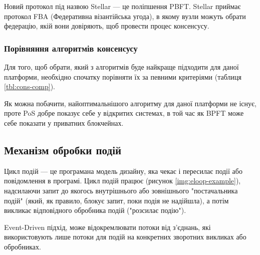 \documentclass{lib/styles/default-style}
\begin{document}
    Новий протокол під назвою Stellar --- це поліпшення PBFT.
    Stellar приймає протокол FBA (Федеративна візантійська угода), в якому вузли можуть обрати федерацію,
    якій вони довіряють, щоб провести процес консенсусу.

    \subsubsection{Порівняння алгоритмів консенсусу}

    Для того, щоб обрати, який з алгоритмів буде найкраще підходити для
    даної платформи, необхідно спочатку порівняти їх за певними критеріями (таблиця \ref{tbl:cons-comp}).

    
    Як можна побачити, найоптимальнішого алгоритму для даної платформи не існує, проте PoS добре показує себе у відкритих системах,
    в той час як BPFT може себе показати у приватних блокчейнах.

\subsection{Механізм обробки подій}

    Цикл подій --- це програмана модель дизайну, яка чекає і пересилає події або повідомлення в програмі.
    Цикл подій працює (рисунок \ref{img:eloop-example}), надсилаючи запит до якогось внутрішнього або зовнішнього "постачальника подій"
    (який, як правило, блокує запит, поки подія не надійшла), а потім викликає відповідного обробника подій ("розсилає подію").

    Event-Driven підхід, може відокремлювати потоки від з'єднань,
    які використовують лише потоки для подій на конкретних зворотних викликах або обробниках.
\end{document}
